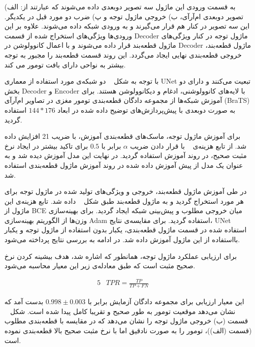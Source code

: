 به قسمت ورودی این ماژول سه تصویر دوبعدی داده می‌شوند که عبارتند از: الف) تصویر دوبعدی ام‌آرآی، ب) خروجی ماژول توجه و پ) ضرب دو مورد قبل در یکدیگر. این سه تصویر در کنار هم قرار می‌گیرند و به ورودی شبکه داده می‌شوند. علاوه بر این ورودی‌ها ویژگی‌های استخراج شده از قسمت Decoder ماژول توجه در کنار ویژگی‌های ماژول قطعه‌بند قرار داده می‌شوند و با اعمال کانوولوشن در Decoder ماژول قطعه‌بند، خروجی قطعه‌بندی نهایی ایجاد می‌گردد. این روند قسمت قطعه‌بند را مجبور به توجه بیشتر به نواحی دارای بافت تومور می کند.


با توجه به شکل ~ دو شبکه‌ی مورد استفاده از معماری UNet تبعیت می‌کنند و دارای دو بخش Decoder و Encoder با لایه‌های کانوولوشنی، ادغام و دیکانوولوشن هستند. برای آموزش شبکه‌ها از مجموعه دادگان قطعه‌بندی تومور مغزی در تصاویر ام‌آرآی (BraTS) به صورت دوبعدی با پیش‌پردازش‌های توضیح داده شده در ابعاد $144*176$ استفاده گردید.
 
برای آموزش ماژول توجه، ماسک‌های قطعه‌بندی آموزش، با ضریب 21 افزایش داده‌ شد. از تابع هزینه‌ی ~ با قرار دادن ضریب $\alpha$ برابر با $0.5$ برای تاکید بیشتر در ایجاد نرخ مثبت صحیح، در روند آموزش استفاده گردید. در نهایت این مدل آموزش دیده شد و به عنوان یک مدل از پیش آموزش داده شده در روند آموزش ماژول قطعه‌بندی استفاده شد. 

در طی آموزش ماژول قطعه‌بند، خروجی و ویژگی‌های تولید شده در ماژول توجه برای هر مورد استخراج گردید و به ماژول قطعه‌بند طبق شکل ~ داده شد. تابع هزینه‌ی این ماژول از BCE میان خروجی مطلوب و پیش‌بینی شبکه ایجاد گردید. برای بهینه‌سازی وزن‌ها از الگوریتم بهینه‌سازی Adam استفاده گردید. برای مقایسه‌ی نتایج، UNet استفاده شده در قسمت ماژول قطعه‌بندی، یکبار بدون استفاده از ماژول توجه و یکبار بااستفاده از این ماژول آموزش داده شد. در ادامه به بررسی نتایج پرداخته می‌شود.

 
برای ارزیابی عملکرد ماژول توجه، همانطور که اشاره شد، هدف بیشینه کردن نرخ صحیح مثبت است که طبق معادله‌ی زیر این معیار محاسبه می‌شود.

\begin{alignat}{5}
	&TPR = \frac{TP}{TP+FN} \label{tpr} && 
\end{alignat}

این معیار ارزیابی برای مجموعه دادگان آزمایش برابر با $0.998 \pm   0.003$ بدست آمد که نشان می‌دهد موقعیت تومور به طور صحیح و تقریبا کامل پیدا شده است. شکل ~ قسمت (ب) خروجی ماژول توجه را نشان می‌دهد که در مقایسه با قطعه‌بندی مطلوب (قسمت (الف))، تومور را به صورت نادقیق اما با نرخ مثبت صحیح بالا قطعه‌بندی نموده است.

